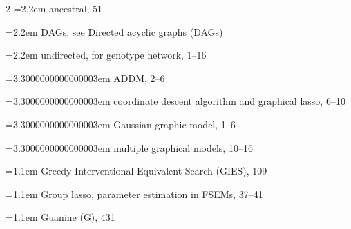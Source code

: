 \begin{multicols}{2}
\noindent\hangindent=2.2em \hspace*{1.1em}ancestral, 51\par
\noindent\hangindent=2.2em \hspace*{1.1em}DAGs, see Directed acyclic graphs (DAGs)\par
\noindent\hangindent=2.2em \hspace*{1.1em}undirected, for genotype network, 1--16\par
\noindent\hangindent=3.3000000000000003em \hspace*{2.2em}ADDM, 2--6\par
\noindent\hangindent=3.3000000000000003em \hspace*{2.2em}coordinate descent algorithm and graphical lasso, 6--10\par
\noindent\hangindent=3.3000000000000003em \hspace*{2.2em}Gaussian graphic model, 1--6\par
\noindent\hangindent=3.3000000000000003em \hspace*{2.2em}multiple graphical models, 10--16\par
\noindent\hangindent=1.1em Greedy Interventional Equivalent Search (GIES), 109\par
\noindent\hangindent=1.1em Group lasso, parameter estimation in FSEMs, 37--41\par
\noindent\hangindent=1.1em Guanine (G), 431\par


\end{multicols}
